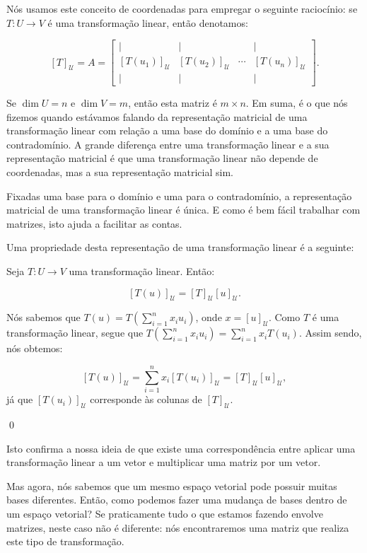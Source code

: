Nós usamos este conceito de coordenadas para empregar o seguinte raciocínio: se $T: U\to V$ é uma transformação linear, então denotamos:

$$
[T]_\mathcal{U} = A = \begin{bmatrix}
	| & | & & | \\
	[T(u_1)]_\mathcal{U} & [T(u_2)]_\mathcal{U} & \cdots & [T(u_n)]_\mathcal{U} \\
	| & | & & |
\end{bmatrix}.
$$

Se $\dim U = n$ e $\dim V = m$, então esta matriz é $m\times n$. Em suma, é o que nós fizemos quando estávamos falando da representação matricial de uma transformação linear com relação a uma base do domínio e a uma base do contradomínio. A grande diferença entre uma transformação linear e a sua representação matricial é que uma transformação linear não depende de coordenadas, mas a sua representação matricial sim.

Fixadas uma base para o domínio e uma para o contradomínio, a representação matricial de uma transformação linear é única. E como é bem fácil trabalhar com matrizes, isto ajuda a facilitar as contas.

Uma propriedade desta representação de uma transformação linear é a seguinte:

\begin{Proposition}
	Seja $T:U\to V$ uma transformação linear. Então:
	
	$$
	[T(u)]_\mathcal{U} = [T]_\mathcal{U}[u]_\mathcal{U}.
	$$
\end{Proposition}

\begin{Proof}
	Nós sabemos que $T(u) = T\left(\sum\limits_{i = 1}^{n} x_iu_i\right)$, onde $x = [u]_\mathcal{U}$. Como $T$ é uma transformação linear, segue que $T\left(\sum\limits_{i = 1}^{n} x_iu_i\right) = \sum\limits_{i = 1}^{n} x_iT(u_i)$. Assim sendo, nós obtemos:
	
	$$
	[T(u)]_\mathcal{U} = \sum\limits_{i = 1}^{n} x_i[T(u_i)]_\mathcal{U} = [T]_\mathcal{U}[u]_\mathcal{U},
	$$
	já que $[T(u_i)]_\mathcal{U}$ corresponde às colunas de $[T]_\mathcal{U}$.
	
	\qed
\end{Proof}

Isto confirma a nossa ideia de que existe uma correspondência entre aplicar uma transformação linear a um vetor e multiplicar uma matriz por um vetor.

Mas agora, nós sabemos que um mesmo espaço vetorial pode possuir muitas bases diferentes. Então, como podemos fazer uma mudança de bases dentro de um espaço vetorial? Se praticamente tudo o que estamos fazendo envolve matrizes, neste caso não é diferente: nós encontraremos uma matriz que realiza este tipo de transformação.

